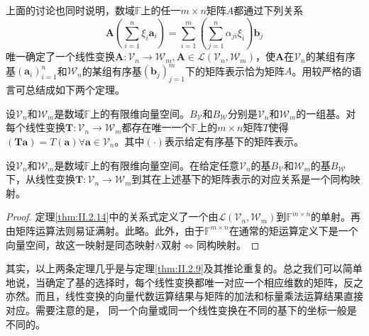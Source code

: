 \documentclass[main.tex]{subfiles}
\begin{document}
上面的讨论也同时说明，数域$\mathbb{F}$上的任一$m\times n$矩阵$A$都通过下列关系
\[
    \mathbf{A}\left(\sum_{i=1}^n\xi_i\mathbf{a}_i\right)=\sum_{i=1}^m\left(\sum_{j=1}^n\alpha_{ji}\xi_i\right)\mathbf{b}_j
\]
唯一确定了一个线性变换$\mathbf{A}:\mathcal{V}_n\rightarrow\mathcal{W}_m,\mathbf{A}\in\mathcal{L}\left(\mathcal{V}_n,\mathcal{W}_m\right)$，使$\mathbf{A}$在$\mathcal{V}_n$的某组有序基$\left(\mathbf{a}_i\right)_{i=1}^n$和$\mathcal{W}_n$的某组有序基$\left(\mathbf{b}_j\right)_{j=1}^m$下的矩阵表示恰为矩阵$A$。用较严格的语言可总结成如下两个定理。

\begin{theorem}\label{thm:II.2.14}
    设$\mathcal{V}_n$和$\mathcal{W}_m$是数域$\mathbb{F}$上的有限维向量空间。$B_{\mathcal{V}}$和$B_{\mathcal{W}}$分别是$\mathcal{V}_n$和$\mathcal{W}_m$的一组基。对每个线性变换$\mathbf{T}:\mathcal{V}_n\rightarrow\mathcal{W}_m$都存在唯一一个$\mathbb{F}$上的$m\times n$矩阵$T$使得$\left(\mathbf{Ta}\right)=T\left(\mathbf{a}\right)\forall\mathbf{a}\in\mathcal{V}_n$。其中$\left(\cdot\right)$表示给定有序基下的矩阵表示。
\end{theorem}

\begin{theorem}\label{thm:II.2.15}
    设$\mathcal{V}_n$和$\mathcal{W}_m$是数域$\mathbb{F}$上的有限维向量空间。在给定任意$\mathcal{V}_n$的基$B_{\mathcal{V}}$和$\mathcal{W}_m$的基$B_{\mathcal{W}}$下，从线性变换$\mathbf{T}:\mathcal{V}_n\rightarrow\mathcal{W}_m$到其在上述基下的矩阵表示的对应关系是一个同构映射。
\end{theorem}
\begin{proof}
    定理\ref{thm:II.2.14}中的关系式定义了一个由$\mathcal{L}\left(\mathcal{V}_n,\mathcal{W}_m\right)$到$\mathbb{F}^{m\times n}$的单射。再由矩阵运算法则易证满射。此略。此外，由于$\mathbb{F}^{m\times n}$在通常的矩运算定义下是一个向量空间，故这一映射是同态映射$\wedge$双射$\Leftrightarrow$同构映射。
\end{proof}

其实，以上两条定理几乎是与定理\ref{thm:II.2.9}及其推论重复的。总之我们可以简单地说，当确定了基的选择时，每个线性变换都唯一对应一个相应维数的矩阵，反之亦然。而且，线性变换的向量代数运算结果与矩阵的加法和标量乘法运算结果直接对应。需要注意的是， 同一个向量或同一个线性变换在不同的基下的坐标一般是不同的。
\end{document}

